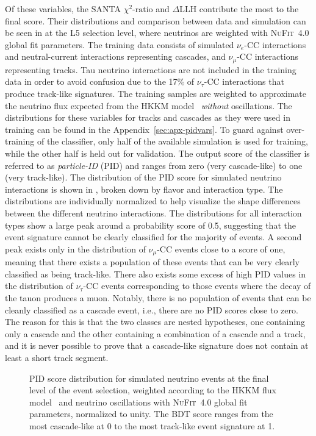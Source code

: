 Of these variables, the SANTA $\chi^2\textrm{-ratio}$ and $\Delta$LLH contribute the most to the final score. Their distributions and comparison between data and simulation can be seen in  at the L5 selection level, where neutrinos are weighted with \textsc{NuFit}~4.0\cite{nufit40} global fit parameters.
The training data consists of simulated $\nu_e$-CC interactions and neutral-current interactions representing cascades, and $\nu_\mu$-CC interactions representing tracks. Tau neutrino interactions are not included in the training data in order to avoid confusion due to the 17\% of $\nu_\tau$-CC interactions that produce track-like signatures. The training samples are weighted to approximate the neutrino flux expected from the HKKM model~ \emph{without} oscillations. The distributions for these variables for tracks and cascades as they were used in training can be found in the Appendix~\ref{sec:apx-pidvars}. To guard against over-training of the classifier, only half of the available simulation is used for training, while the other half is held out for validation. The output score of the classifier is referred to as \emph{particle-ID} (PID) and ranges from zero (very cascade-like) to one (very track-like). The distribution of the PID score for simulated neutrino interactions is shown in , broken down by flavor and interaction type. The distributions are individually normalized to help visualize the shape differences between the different neutrino interactions. The distributions for all interaction types show a large peak around a probability score of 0.5, suggesting that the event signature cannot be clearly classified for the majority of events. A second peak exists only in the distribution of $\nu_\mu$-CC events close to a score of one, meaning that there exists a population of these events that can be very clearly classified as being track-like. There also exists some excess of high PID values in the distribution of $\nu_\tau$-CC events corresponding to those events where the decay of the tauon produces a muon. Notably, there is no population of events that can be cleanly classified as a cascade event, i.e., there are no PID scores close to zero. The reason for this is that the two classes are nested hypotheses, one containing only a cascade and the other containing a combination of a cascade and a track, and it is never possible to prove that a cascade-like signature does not contain at least a short track segment.
\begin{figure}
    \centering
    
    \caption{PID score distribution for simulated neutrino events at the final level of the event selection, weighted according to the HKKM flux model~\cite{Honda:2015fha} and neutrino oscillations with \textsc{NuFit}~4.0\cite{nufit40} global fit parameters, normalized to unity. The BDT score ranges from the most cascade-like at 0 to the most track-like event signature at 1.}
    \label{fig:pid-score}
\end{figure}

